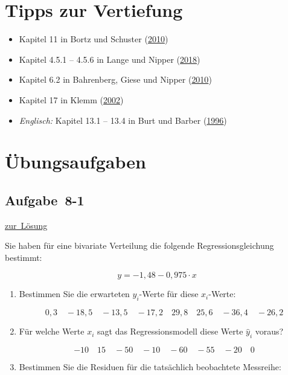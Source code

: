 \documentclass[
  11pt,
  ngerman,
  a4paper,
]{report}
\providecommand{\tightlist}{%
  \setlength{\itemsep}{0pt}\setlength{\parskip}{0pt}}
\begin{document}
\hypertarget{tipps-zur-vertiefung-7}{%
\section*{Tipps zur Vertiefung}\label{tipps-zur-vertiefung-7}}

\begin{itemize}
\tightlist
\item
  Kapitel 11 in Bortz und Schuster (\protect\hyperlink{ref-bortz}{2010})
\item
  Kapitel 4.5.1 -- 4.5.6 in Lange und Nipper (\protect\hyperlink{ref-delange}{2018})
\item
  Kapitel 6.2 in Bahrenberg, Giese und Nipper (\protect\hyperlink{ref-bahrenberg}{2010})
\item
  Kapitel 17 in Klemm (\protect\hyperlink{ref-klemm}{2002})
\item
  \emph{Englisch:} Kapitel 13.1 -- 13.4 in Burt und Barber (\protect\hyperlink{ref-burt}{1996})
\end{itemize}

\hypertarget{uxfcbungsaufgaben-7}{%
\section*{Übungsaufgaben}\label{uxfcbungsaufgaben-7}}

\hypertarget{aufgabe-8-1}{%
\subsection{Aufgabe~8-1}\label{aufgabe-8-1}}

\protect\hyperlink{loesung-8-1}{zur~Lösung}

Sie haben für eine bivariate Verteilung die folgende Regressionsgleichung bestimmt:

\[
y=-1{,}48-0{,}975\cdot x
\]

\begin{enumerate}
\def\labelenumi{\alph{enumi})}
\item
  Bestimmen Sie die erwarteten \(\hat{y}_i\)-Werte für diese \(x_i\)-Werte:

  \[
   0{,}3\quad-18{,}5\quad-13{,}5\quad-17{,}2\quad29{,}8\quad25{,}6\quad-36{,}4\quad-26{,}2
   \]
\item
  Für welche Werte \(x_i\) sagt das Regressionsmodell diese Werte \(\hat{y}_i\) voraus?

  \[
   -10\quad15\quad-50\quad-10\quad-60\quad-55\quad-20\quad0
   \]
\item
  Bestimmen Sie die Residuen für die tatsächlich beobachtete Messreihe:
\end{enumerate}
\end{document}
